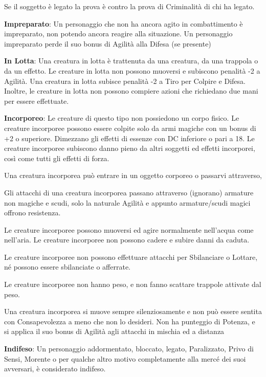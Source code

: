 \documentclass[a4paper,11pt,twoside,openany]{book}
\begin{document}
Se il soggetto è legato la prova è contro la prova di Criminalità di chi ha legato.

\textbf{Impreparato}: Un personaggio che non ha ancora agito in combattimento è impreparato, non potendo ancora reagire alla situazione. Un personaggio impreparato perde il suo bonus di Agilità alla Difesa (se presente)

\textbf{In Lotta}: Una creatura in lotta è trattenuta da una creatura,
da una trappola o da un effetto. Le creature in lotta non possono
muoversi e subiscono penalità -2 a Agilità. Una creatura in lotta
subisce penalità -2 a Tiro per Colpire e Difesa. Inoltre, le creature
in lotta non possono compiere azioni che richiedano due mani per essere
effettuate.

\textbf{Incorporeo}: Le creature di questo tipo non possiedono un corpo fisico. Le creature incorporee possono essere colpite solo da armi magiche con un bonus di +2 o superiore. Dimezzano gli effetti di essenze con DC inferiore o pari a 18. Le creature incorporee subiscono danno pieno da altri soggetti ed effetti incorporei, così come tutti gli effetti di forza.

Una creatura incorporea può entrare in un oggetto corporeo o passarvi attraverso,

Gli attacchi di una creatura incorporea passano attraverso (ignorano) armature non magiche e scudi, solo la naturale Agilità e appunto armature/scudi magici offrono resistenza.

Le creature incorporee possono muoversi ed agire normalmente nell'acqua come nell'aria. Le creature incorporee non possono cadere e subire danni da caduta.

Le creature incorporee non possono effettuare attacchi per Sbilanciare o Lottare, né possono essere sbilanciate o afferrate.

Le creature incorporee non hanno peso, e non fanno scattare trappole attivate dal peso.

Una creatura incorporea si muove sempre silenziosamente e non può essere sentita con Consapevolezza a meno che non lo desideri. Non ha punteggio di Potenza, e si applica il suo bonus di Agilità agli attacchi in mischia ed a distanza

\textbf{Indifeso}: Un personaggio addormentato, bloccato, legato, Paralizzato, Privo di Sensi, Morente o per qualche altro motivo completamente alla mercé dei suoi avversari, è considerato indifeso.
\end{document}
